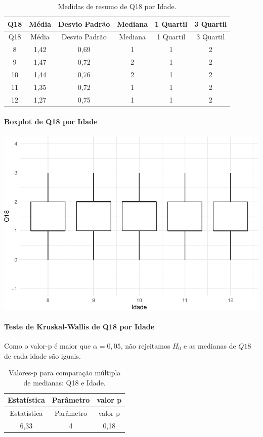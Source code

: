 \documentclass[]{article}
\let\oldparagraph\paragraph
\renewcommand{\paragraph}[1]{\oldparagraph{#1}\mbox{}}
\begin{document}
\begin{longtable}[]{@{}cccccc@{}}
\caption{\label{tab:unnamed-chunk-236}Medidas de resumo de Q18 por Idade.}\tabularnewline
\toprule
Q18 & Média & Desvio Padrão & Mediana & 1 Quartil & 3 Quartil\tabularnewline
\midrule
\endfirsthead
\toprule
Q18 & Média & Desvio Padrão & Mediana & 1 Quartil & 3 Quartil\tabularnewline
\midrule
\endhead
8 & 1,42 & 0,69 & 1 & 1 & 2\tabularnewline
9 & 1,47 & 0,72 & 2 & 1 & 2\tabularnewline
10 & 1,44 & 0,76 & 2 & 1 & 2\tabularnewline
11 & 1,35 & 0,72 & 1 & 1 & 2\tabularnewline
12 & 1,27 & 0,75 & 1 & 1 & 2\tabularnewline
\bottomrule
\end{longtable}

\hypertarget{boxplot-de-q18-por-idade}{%
\paragraph{Boxplot de Q18 por Idade}\label{boxplot-de-q18-por-idade}}

\begin{center}\includegraphics[width=0.75\linewidth]{relatorio_files/figure-latex/unnamed-chunk-237-1} \end{center}

\hypertarget{teste-de-kruskal-wallis-de-q18-por-idade}{%
\paragraph{Teste de Kruskal-Wallis de Q18 por Idade}\label{teste-de-kruskal-wallis-de-q18-por-idade}}

Como o valor-p é maior que \(\alpha=0,05\), não rejeitamos \(H_0\) e as medianas de \(Q18\) de cada idade são iguais.

\begin{longtable}[]{@{}ccc@{}}
\caption{\label{tab:unnamed-chunk-238}Valores-p para comparação múltipla de medianas: Q18 e Idade.}\tabularnewline
\toprule
Estatística & Parâmetro & valor p\tabularnewline
\midrule
\endfirsthead
\toprule
Estatística & Parâmetro & valor p\tabularnewline
\midrule
\endhead
6,33 & 4 & 0,18\tabularnewline
\bottomrule
\end{longtable}
\end{document}

